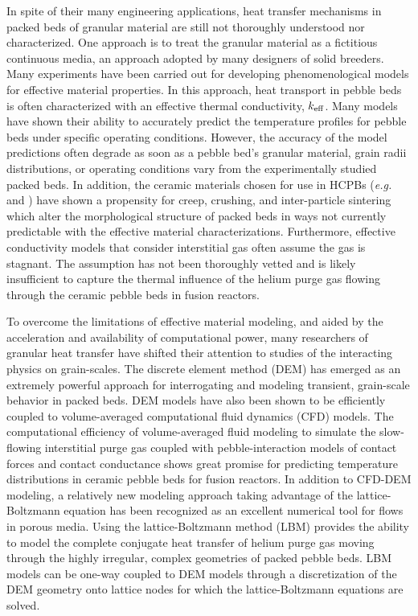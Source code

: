 In spite of their many engineering applications, heat transfer mechanisms in packed beds of granular material are still not thoroughly understood nor characterized. One approach is to treat the granular material as a fictitious continuous media, an approach adopted by many designers of solid breeders. Many experiments have been carried out for developing phenomenological models for effective material properties. In this approach, heat transport in pebble beds is often characterized with an effective thermal conductivity, $k_\text{eff}$. Many models have shown their ability to accurately predict the temperature profiles for pebble beds under specific operating conditions. However, the accuracy of the model predictions often degrade as soon as a pebble bed's granular material, grain radii distributions, or operating conditions vary from the experimentally studied packed beds. In addition, the ceramic materials chosen for use in HCPBs (\textit{e.g.} \lit and \lis) have shown a propensity for creep, crushing, and inter-particle sintering which alter the morphological structure of packed beds in ways not currently predictable with the effective material characterizations. Furthermore, effective conductivity models that consider interstitial gas often assume the gas is stagnant. The assumption has not been thoroughly vetted and is likely insufficient to capture the thermal influence of the helium purge gas flowing through the ceramic pebble beds in fusion reactors.

To overcome the limitations of effective material modeling, and aided by the acceleration and availability of computational power, many researchers of granular heat transfer have shifted their attention to studies of the interacting physics on grain-scales. The discrete element method (DEM) has emerged as an extremely powerful approach for interrogating and modeling transient, grain-scale behavior in packed beds. DEM models have also been shown to be efficiently coupled to volume-averaged computational fluid dynamics (CFD) models. The computational efficiency of volume-averaged fluid modeling to simulate the slow-flowing interstitial purge gas coupled with pebble-interaction models of contact forces and contact conductance shows great promise for predicting temperature distributions in ceramic pebble beds for fusion reactors. In addition to CFD-DEM modeling, a relatively new modeling approach taking advantage of the lattice-Boltzmann equation has been recognized as an excellent numerical tool for flows in porous media. Using the lattice-Boltzmann method (LBM) provides the ability to model the complete conjugate heat transfer of helium purge gas moving through the highly irregular, complex geometries of packed pebble beds. LBM models can be one-way coupled to DEM models through a discretization of the DEM geometry onto lattice nodes for which the lattice-Boltzmann equations are solved.







